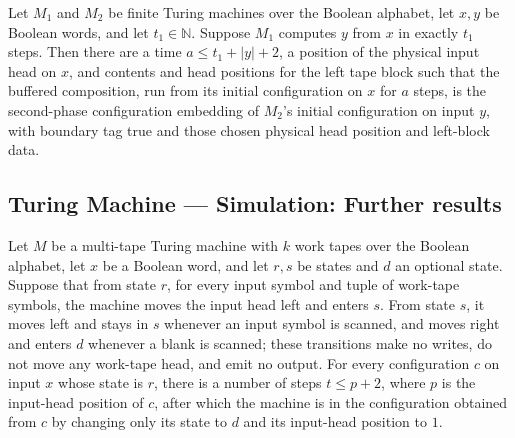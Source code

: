\begin{lemma}
\label{Turing.FinTM.bufferedComp_start}
\leanok
{}
Let $M_1$ and $M_2$ be finite Turing machines over the Boolean alphabet, let $x,y$ be
Boolean words, and let $t_1\in\mathbb{N}$. Suppose $M_1$ computes $y$ from $x$ in
exactly $t_1$ steps. Then there are a time $a\le t_1+|y|+2$, a position of the physical
input head on $x$, and contents and head positions for the left tape block such that the
buffered composition, run from its initial configuration on $x$ for $a$ steps, is the
second-phase configuration embedding of $M_2$'s initial configuration on input $y$, with
boundary tag true and those chosen physical head position and left-block data.
\end{lemma}

\subsection*{Turing Machine --- Simulation: Further results}

\begin{lemma}
\label{Turing.FinTM.timed_rewind}
\leanok
{}
Let $M$ be a multi-tape Turing machine with $k$ work tapes over the Boolean alphabet,
let $x$ be a Boolean word, and let $r,s$ be states and $d$ an optional state. Suppose
that from state $r$, for every input symbol and tuple of work-tape symbols, the machine
moves the input head left and enters $s$. From state $s$, it moves left and stays in $s$
whenever an input symbol is scanned, and moves right and enters $d$ whenever a blank is
scanned; these transitions make no writes, do not move any work-tape head, and emit no
output. For every configuration $c$ on input $x$ whose state is $r$, there is a number
of steps $t\le p+2$, where $p$ is the input-head position of $c$, after which the
machine is in the configuration obtained from $c$ by changing only its state to $d$ and
its input-head position to $1$.
\end{lemma}

